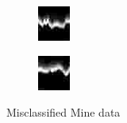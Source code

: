 \documentclass[english, 12pt]{article}
\begin{document}
\begin{figure}[H]
\begin{subfigure}[b]{0.2\textwidth}
        \caption{}
    \end{subfigure}
    \begin{subfigure}[b]{0.2\textwidth}
        \includegraphics[width=\textwidth]{WC03.jpg}
        \caption{}
    \end{subfigure}
    \begin{subfigure}[b]{0.2\textwidth}
        \includegraphics[width=\textwidth]{WC04.jpg}
        \caption{}
    \end{subfigure}
    \caption{Misclassified Mine data}\label{fig:wc0}
\end{figure}
\end{document}
